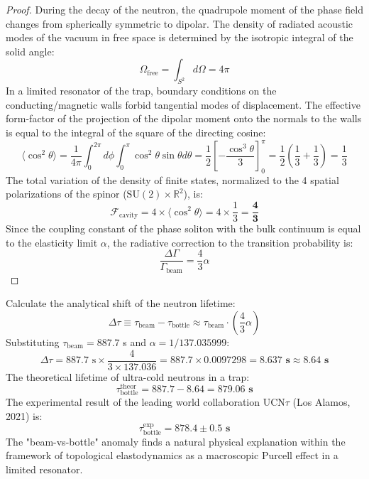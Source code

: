\documentclass[12pt,a4paper]{article}
\begin{document}
		\begin{proof}
			During the decay of the neutron, the quadrupole moment of the phase field changes from spherically symmetric to dipolar. The density of radiated acoustic modes of the vacuum in free space is determined by the isotropic integral of the solid angle:
			\begin{equation}
				\Omega_{\text{free}} = \int_{S^2} d\Omega = 4\pi
			\end{equation}
			In a limited resonator of the trap, boundary conditions on the conducting/magnetic walls forbid tangential modes of displacement. The effective form-factor of the projection of the dipolar moment onto the normals to the walls is equal to the integral of the square of the directing cosine:
			\begin{equation}
				\langle \cos^2\theta \rangle = \frac{1}{4\pi} \int_0^{2\pi} d\phi \int_0^\pi \cos^2\theta \sin\theta d\theta = \frac{1}{2} \left[ -\frac{\cos^3\theta}{3} \right]_0^\pi = \frac{1}{2} \left( \frac{1}{3} + \frac{1}{3} \right) = \frac{1}{3}
			\end{equation}
			The total variation of the density of finite states, normalized to the 4 spatial polarizations of the spinor ($\mathrm{SU}(2) \times \mathbb{R}^2$), is:
			\begin{equation}
				\mathcal{F}_{\text{cavity}} = 4 \times \langle \cos^2\theta \rangle = 4 \times \frac{1}{3} = \mathbf{\frac{4}{3}}
			\end{equation}
			Since the coupling constant of the phase soliton with the bulk continuum is equal to the elasticity limit $\alpha$, the radiative correction to the transition probability is:
			\begin{equation}
				\frac{\Delta \Gamma}{\Gamma_{\text{beam}}} = \frac{4}{3} \alpha
			\end{equation}
		\end{proof}
		
		Calculate the analytical shift of the neutron lifetime:
		\begin{equation}
			\Delta \tau \equiv \tau_{\text{beam}} - \tau_{\text{bottle}} \approx \tau_{\text{beam}} \cdot \left( \frac{4}{3} \alpha \right)
		\end{equation}
		Substituting $\tau_{\text{beam}} = 887.7$ s and $\alpha = 1/137.035999$:
		\begin{equation}
			\Delta \tau = 887.7 \text{ s} \times \frac{4}{3 \times 137.036} = 887.7 \times 0.0097298 = \mathbf{8.637 \text{ s}} \approx \mathbf{8.64 \text{ s}}
		\end{equation}
		The theoretical lifetime of ultra-cold neutrons in a trap:
		\begin{equation}
			\tau_{\text{bottle}}^{\text{theor}} = 887.7 - 8.64 = \mathbf{879.06 \text{ s}}
		\end{equation}
		The experimental result of the leading world collaboration $\text{UCN}\tau$ (Los Alamos, 2021) is:
		\begin{equation}
			\tau_{\text{bottle}}^{\text{exp}} = \mathbf{878.4 \pm 0.5 \text{ s}}
		\end{equation}
		The "beam-vs-bottle" anomaly finds a natural physical explanation within the framework of topological elastodynamics as a macroscopic Purcell effect in a limited resonator.
		
\end{document}
